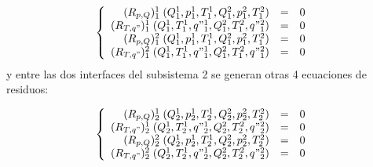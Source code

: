 \begin{equation}
\left\{ \begin{array}{rcl}
(R_{p,Q})_{1}^{1}  \;(Q_1^1, p_1^1, T_1^1, Q_1^2, p_1^2, T_1^2) &=& 0 \\
(R_{T,q"})_{1}^{1} \;(Q_1^1, T_1^1, q"_1^1, Q_1^2, T_1^2, q"_1^2) &=& 0 \\
(R_{p,Q})_{1}^{2}  \;(Q_1^1, p_1^1, T_1^1, Q_1^2, p_1^2, T_1^2) &=& 0 \\
(R_{T,q"})_{1}^{2} \;(Q_1^1, T_1^1, q"_1^1, Q_1^2, T_1^2, q"_1^2) &=& 0 
\end{array}
\right.
\end{equation}
y entre las dos interfaces del subsistema 2 se generan otras 4 ecuaciones de residuos:

\begin{equation}
\left\{ \begin{array}{rcl}
(R_{p,Q})_{2}^{1}  \;(Q_2^1, p_2^1, T_2^1, Q_2^2, p_2^2, T_2^2) &=& 0 \\
(R_{T,q"})_{2}^{1} \;(Q_2^1, T_2^1, q"_2^1, Q_2^2, T_2^2, q"_2^2) &=& 0 \\
(R_{p,Q})_{2}^{2}  \;(Q_2^1, p_2^1, T_2^1, Q_2^2, p_2^2, T_2^2) &=& 0 \\
(R_{T,q"})_{2}^{2} \;(Q_2^1, T_2^1, q"_2^1, Q_2^2, T_2^2, q"_2^2) &=& 0
\end{array}
\right.
\end{equation}


